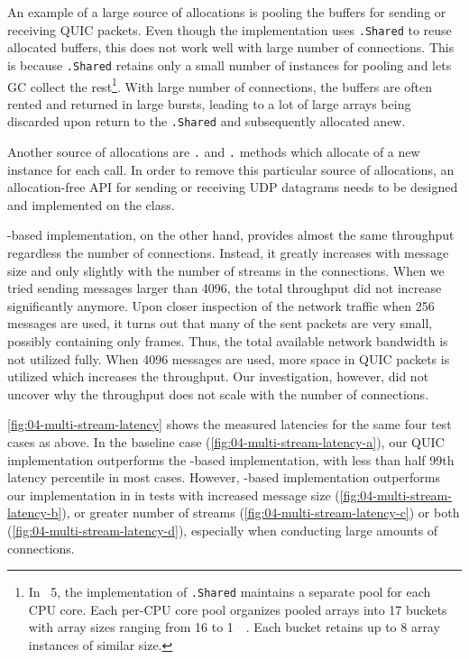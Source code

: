 An example of a large source of allocations is pooling the buffers for sending or receiving QUIC
packets. Even though the implementation uses \ArrayPoolOf{\Byte}\texttt{.Shared} to reuse allocated
buffers, this does not work well with large number of connections. This is because
\ArrayPoolOf{\Byte}\texttt{.Shared} retains only a small number of \ArrayOf{\Byte} instances for
pooling and lets GC collect the rest\footnote{In \dotnet{}~5, the implementation of
  \ArrayPoolOf{\Byte}\texttt{.Shared} maintains a separate pool for each CPU core. Each per-CPU core
  pool organizes pooled arrays into 17 buckets with array sizes ranging from \SI{16}{\byte} to
  \SI{1}{\mebi\byte}. Each bucket retains up to 8 array instances of similar size.}. With large
number of connections, the buffers are often rented and returned in large bursts, leading to a lot
of large arrays being discarded upon return to the \ArrayPoolOf{\Byte}\texttt{.Shared} and
subsequently allocated anew.

Another source of allocations are \Socket{}\texttt{.} and
\Socket{}\texttt{.} methods which allocate of a new  instance
for each call. In order to remove this particular source of allocations, an allocation-free API for
sending or receiving UDP datagrams needs to be designed and implemented on the \Socket{} class.

\libmsquic{}-based implementation, on the other hand, provides almost the same throughput regardless
the number of connections. Instead, it greatly increases with message size and only slightly with
the number of streams in the connections. When we tried sending messages larger than
\SI{4096}{\byte}, the total throughput did not increase significantly anymore. Upon closer
inspection of the \libmsquic{} network traffic when \SI{256}{\byte} messages are used, it turns out
that many of the sent packets are very small, possibly containing only \ACK{} frames. Thus, the
total available network bandwidth is not utilized fully. When \SI{4096}{\byte} messages are used,
more space in QUIC packets is utilized which increases the throughput. Our investigation, however,
did not uncover why the \libmsquic{} throughput does not scale with the number of connections.

\autoref{fig:04-multi-stream-latency} shows the measured latencies for the same four test cases as
above. In the baseline case (\autoref{fig:04-multi-stream-latency-a}), our QUIC implementation
outperforms the \libmsquic{}-based implementation, with less than half 99th latency percentile in
most cases. However, \libmsquic{}-based implementation outperforms our implementation in in tests
with increased message size (\autoref{fig:04-multi-stream-latency-b}), or greater number of streams
(\autoref{fig:04-multi-stream-latency-c}) or both (\autoref{fig:04-multi-stream-latency-d}),
especially when conducting large amounts of connections.

